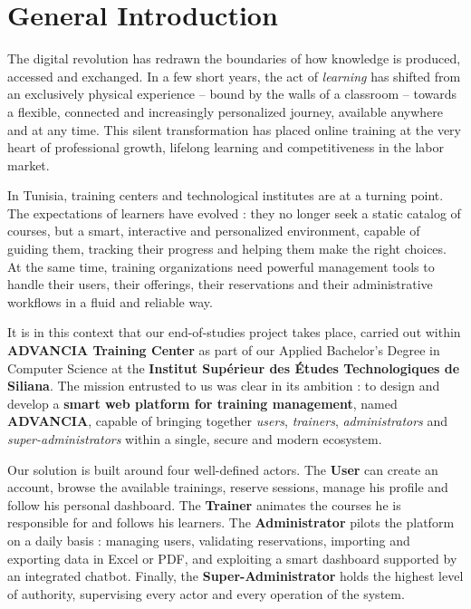 
\chapter*{General Introduction}


\noindent
The digital revolution has redrawn the boundaries of how knowledge is produced, accessed and exchanged. In a few short years, the act of \textit{learning} has shifted from an exclusively physical experience -- bound by the walls of a classroom -- towards a flexible, connected and increasingly personalized journey, available anywhere and at any time. This silent transformation has placed online training at the very heart of professional growth, lifelong learning and competitiveness in the labor market.

\medskip
\noindent
In Tunisia, training centers and technological institutes are at a turning point. The expectations of learners have evolved : they no longer seek a static catalog of courses, but a smart, interactive and personalized environment, capable of guiding them, tracking their progress and helping them make the right choices. At the same time, training organizations need powerful management tools to handle their users, their offerings, their reservations and their administrative workflows in a fluid and reliable way.

\medskip
\noindent
It is in this context that our end-of-studies project takes place, carried out within \textbf{ADVANCIA Training Center} as part of our Applied Bachelor's Degree in Computer Science at the \textbf{Institut Supérieur des Études Technologiques de Siliana}. The mission entrusted to us was clear in its ambition : to design and develop a \textbf{smart web platform for training management}, named \textbf{ADVANCIA}, capable of bringing together \textit{users}, \textit{trainers}, \textit{administrators} and \textit{super-administrators} within a single, secure and modern ecosystem.

\medskip
\noindent
Our solution is built around four well-defined actors. The \textbf{User} can create an account, browse the available trainings, reserve sessions, manage his profile and follow his personal dashboard. The \textbf{Trainer} animates the courses he is responsible for and follows his learners. The \textbf{Administrator} pilots the platform on a daily basis : managing users, validating reservations, importing and exporting data in Excel or PDF, and exploiting a smart dashboard supported by an integrated chatbot. Finally, the \textbf{Super-Administrator} holds the highest level of authority, supervising every actor and every operation of the system.

